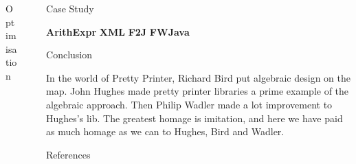 \documentclass[final]{beamer}
\newlength{\sepwid}
\newlength{\onecolwid}
\newlength{\twocolwid}
\begin{document}
\begin{frame}[t]
\begin{columns}[t]
\begin{column}{\twocolwid}
\begin{columns}[t,totalwidth=\twocolwid]
\begin{column}{\onecolwid}
\begin{block}{Optimisation}
\end{block}


\end{column} %

\end{columns} %

\end{column} %

\begin{column}{\sepwid}\end{column} %

\begin{column}{\onecolwid} %


\begin{block}{Case Study}

\textbf{ArithExpr}
\textbf{XML}
\textbf{F2J}
\textbf{FWJava}

\end{block}



\begin{block}{Conclusion}

In the world of Pretty Printer, Richard Bird put algebraic design on the map. John Hughes made pretty printer libraries a prime example of the algebraic approach. Then Philip Wadler made a lot improvement to Hughes's lib. The greatest homage is imitation, and here we have paid as much homage as we can to Hughes, Bird and Wadler.





\begin{block}{References}

\nocite{*} %
\small{
\vspace{0.75in}}


\end{block}
\end{block}
\end{column}
\end{columns}
\end{frame}
\end{document}
